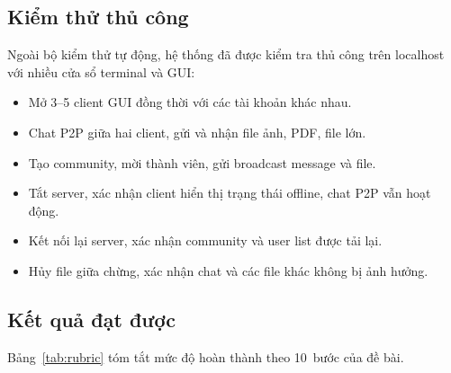 \subsection{Kiểm thử thủ công}

Ngoài bộ kiểm thử tự động, hệ thống đã được kiểm tra thủ công trên localhost với nhiều cửa sổ terminal và GUI:

\begin{itemize}
\item Mở 3--5 client GUI đồng thời với các tài khoản khác nhau.
\item Chat P2P giữa hai client, gửi và nhận file ảnh, PDF, file lớn.
\item Tạo community, mời thành viên, gửi broadcast message và file.
\item Tắt server, xác nhận client hiển thị trạng thái offline, chat P2P vẫn hoạt động.
\item Kết nối lại server, xác nhận community và user list được tải lại.
\item Hủy file giữa chừng, xác nhận chat và các file khác không bị ảnh hưởng.
\end{itemize}

\subsection{Kết quả đạt được}

Bảng~\ref{tab:rubric} tóm tắt mức độ hoàn thành theo 10~bước của đề bài.

